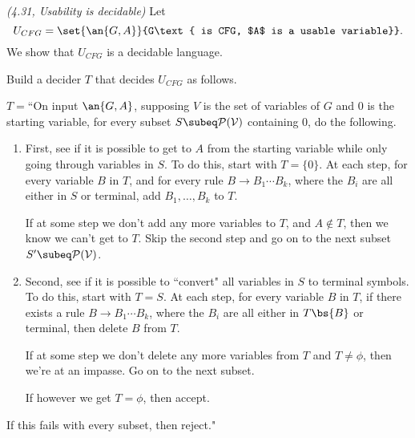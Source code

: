 \begin{problem}{\it(4.31, Usability is decidable)}
Let
\[
U_{CFG}=\set{\an{G,A}}{G\text{ is CFG, $A$ is a usable variable}}.
\]
We show that $U_{CFG}$ is a decidable language.

Build a decider $T$ that decides $U_{CFG}$ as follows. 

$T=$``On input $\an{G,A}$, supposing $V$ is the set of variables of $G$ and 0 is the starting variable, 
for every subset $S\subeq \cal P(V)$ containing 0, do the following.
\begin{enumerate}
\item
First, see if it is possible to get to $A$ from the starting variable while only going through variables in $S$. To do this, start with $T=\{0\}$. At each step, for every variable $B$ in $T$, and for every rule $B\to B_1\cdots B_k$, where the $B_i$ are all either in $S$ or terminal, add $B_1,\ldots, B_k$ to $T$.

If at some step we don't add any more variables to $T$, and $A\nin T$, then we know we can't get to $T$. Skip the second step and go on to the next subset $S'\subeq \cal P(V)$.
\item
Second, see if it is possible to ``convert" all variables in $S$ to terminal symbols. To do this, start with $T=S$. At each step, for every variable $B$ in $T$, if there exists a rule $B\to B_1\cdots B_k$, where the $B_i$ are all either in $T\bs\{B\}$ or terminal, then delete $B$ from $T$.

If at some step we don't delete any more variables from $T$ and $T\ne \phi$, then we're at an impasse. Go on to the next subset.

If however we get $T=\phi$, then accept.
\end{enumerate}
If this fails with every subset, then reject."


\end{problem}
